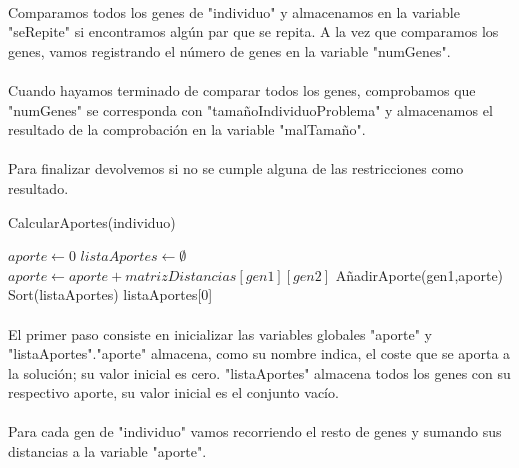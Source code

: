 	\paragraph{}Comparamos todos los genes de "individuo" y almacenamos en la variable "seRepite" si encontramos algún par que se repita. A la vez que comparamos los genes, vamos registrando el número de genes en la variable "numGenes".
	
	\paragraph{}Cuando hayamos terminado de comparar todos los genes, comprobamos que "numGenes" se corresponda con "tamañoIndividuoProblema" y almacenamos el resultado de la comprobación en la variable "malTamaño".
	
	\paragraph{}Para finalizar devolvemos si no se cumple alguna de las restricciones como resultado.

	\begin{algorithm}[H]
		\caption{CalcularAportes(individuo)}
		\begin{algorithmic}
			\STATE $aporte \leftarrow 0$
			\STATE $listaAportes \leftarrow \emptyset$
			\STATE $aporte \leftarrow aporte + matrizDistancias[gen1][gen2]$
			\ENDFOR
			\STATE AñadirAporte(gen1,aporte)
			\ENDFOR
			\STATE Sort(listaAportes)
			\RETURN listaAportes[0]
		\end{algorithmic}
	\end{algorithm}
	
	\paragraph{}El primer paso consiste en inicializar las variables globales "aporte" y "listaAportes"."aporte" almacena, como su nombre indica, el coste que se aporta a la solución; su valor inicial es cero. "listaAportes" almacena todos los genes con su respectivo aporte, su valor inicial es el conjunto vacío.
	
	\paragraph{}Para cada gen de "individuo" vamos recorriendo el resto de genes y sumando sus distancias a la variable "aporte".
	
